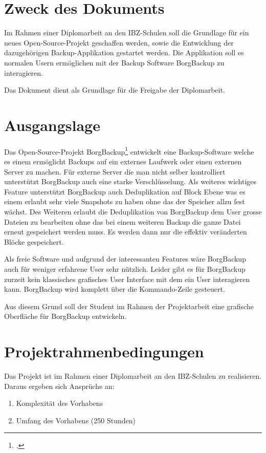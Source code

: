 
\section{Zweck des Dokuments}
\label{sec:org3f3f0c3}
Im Rahmen einer Diplomarbeit an den IBZ-Schulen soll die Grundlage für ein neues
Open-Source-Projekt geschaffen werden, sowie die Entwicklung der dazugehörigen
Backup-Applikation gestartet werden. Die Applikation soll es normalen Usern
ermöglichen mit der Backup Software BorgBackup zu interagieren.

Das Dokument dient als Grundlage für die Freigabe der Diplomarbeit.

\section{Ausgangslage}
\label{sec:orgc599548}
Das Open-Source-Projekt BorgBackup\footcite{borgbackup} entwickelt eine
Backup-Software welche es einem ermöglicht Backups auf ein externes Laufwerk
oder einen externen Server zu machen. Für externe Server die man nicht selber
kontrolliert unterstützt BorgBackup auch eine starke Verschlüsselung. Als
weiteres wichtiges Feature unterstützt BorgBackup auch Deduplikation auf Block
Ebene was es einem erlaubt sehr viele Snapshots zu haben ohne das der Speicher
allzu fest wächst. Des Weiteren erlaubt die Deduplikation von BorgBackup dem
User grosse Dateien zu bearbeiten ohne das bei einem weiteren Backup die ganze
Datei erneut gespeichert werden muss. Es werden dann nur die effektiv
veränderten Blöcke gespeichert.

Als freie Software und aufgrund der interessanten Features wäre BorgBackup auch
für weniger erfahrene User sehr nützlich. Leider gibt es für BorgBackup zurzeit
kein klassisches grafisches User Interface mit dem ein User interagieren kann.
BorgBackup wird komplett über die Kommando-Zeile gesteuert.

Aus diesem Grund soll der Student im Rahmen der Projektarbeit eine grafische
Oberfläche für BorgBackup entwickeln.

\section{Projektrahmenbedingungen}
\label{sec:orge23caff}

Das Projekt ist im Rahmen einer Diplomarbeit an den IBZ-Schulen zu realisieren.
Daraus ergeben sich Ansprüche an:

\begin{enumerate}
\item Komplexität des Vorhabens
\item Umfang des Vorhabens (250 Stunden)
\end{enumerate}

